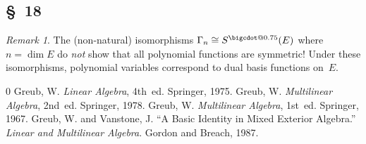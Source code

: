 \documentclass[letterpaper,12pt]{article}
\makeatletter
\newcommand{\iso}{\cong}
\newcommand{\bigcdot}[1]{\mathbin{\mathpalette\bigcdot@{#1}}}
\newcommand{\bigcdot@}[2]{%
  \sbox0{$#1\vcenter{}$}%
  \sbox2{$#1\cdot\m@th$}%
  \hbox{%
    \hfil
    \raise\ht0\hbox{%
      \scalebox{#2}{%
        \lower\ht0\hbox{$#1\bullet\m@th$}%
      }%
    }%
    \hfil
  }%
}
\newcommand{\sdot}{\bigcdot{0.75}}
\theoremstyle{definition}
\theoremstyle{remark}
\newtheorem*{rmk}{Remark}
\makeatother
\begin{document}
\subsection*{\S~18}
\begin{rmk}
The (non-natural) isomorphisms \(\Gamma_n\iso S^{\sdot}(E)\) where \(n=\dim E\) do \emph{not} show that all polynomial functions are symmetric! Under these isomorphisms, polynomial variables correspond to dual basis functions on~\(E\).
\end{rmk}

\newpage
\begin{thebibliography}{0}
 Greub, W. \textit{Linear Algebra}, 4th~ed. Springer, 1975.
 Greub, W. \textit{Multilinear Algebra}, 2nd~ed. Springer, 1978.
 Greub, W. \textit{Multilinear Algebra}, 1st~ed. Springer, 1967.
 Greub, W. and Vanstone, J. ``A Basic Identity in Mixed Exterior Algebra.'' \textit{Linear and Multilinear Algebra}. Gordon and Breach, 1987.
\end{thebibliography}
\end{document}
